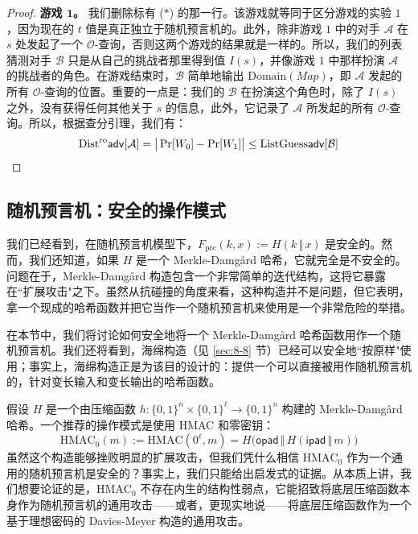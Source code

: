 \begin{proof}
\vspace{5pt}

\noindent\textbf{游戏 $\mathbf{1}$。}
我们删除标有 ($*$) 的那一行。该游戏就等同于区分游戏的实验 $1$，因为现在的 $t$ 值是真正独立于随机预言机的。此外，除非游戏 $1$ 中的对手 $\mathcal{A}$ 在 $s$ 处发起了一个 $\mathcal{O}$-查询，否则这两个游戏的结果就是一样的。所以，我们的列表猜测对手 $\mathcal{B}$ 只是从自己的挑战者那里得到值 $I(s)$，并像游戏 $1$ 中那样扮演 $\mathcal{A}$ 的挑战者的角色。在游戏结束时，$\mathcal{B}$ 简单地输出 $\mathrm{Domain}(Map)$，即 $\mathcal{A}$ 发起的所有 $\mathcal{O}$-查询的位置。重要的一点是：我们的 $\mathcal{B}$ 在扮演这个角色时，除了 $I(s)$ 之外，没有获得任何其他关于 $s$ 的信息，此外，它记录了 $\mathcal{A}$ 所发起的所有 $\mathcal{O}$-查询。所以，根据查分引理，我们有：
\[
\mathrm{Dist}^\mathrm{ro}\mathsf{adv}[\mathcal{A}]=
\big\lvert
\Pr[W_0]-\Pr[W_1]
\big\rvert
\leq
\mathrm{ListGuess}\mathsf{adv}[\mathcal{B}]\qedhere
\]
\end{proof}

\subsection{随机预言机：安全的操作模式}\label{subsec:8-10-3}

我们已经看到，在随机预言机模型下，$F_\mathrm{pre}(k,x):=H(k\,\Vert\,x)$ 是安全的。然而，我们还知道，如果 $H$ 是一个 Merkle-Damg{\aa}rd 哈希，它就完全是不安全的。问题在于，Merkle-Damg{\aa}rd 构造包含一个非常简单的迭代结构，这将它暴露在``扩展攻击"之下。虽然从抗碰撞的角度来看，这种构造并不是问题，但它表明，拿一个现成的哈希函数并把它当作一个随机预言机来使用是一个非常危险的举措。

在本节中，我们将讨论如何安全地将一个 Merkle-Damg{\aa}rd 哈希函数用作一个随机预言机。我们还将看到，海绵构造（见 \ref{sec:8-8} 节）已经可以安全地``按原样"使用；事实上，海绵构造正是为该目的设计的：提供一个可以直接被用作随机预言机的，针对变长输入和变长输出的哈希函数。

假设 $H$ 是一个由压缩函数 $h:\{0,1\}^n\times\{0,1\}^\ell\to\{0,1\}^n$ 构建的 Merkle-Damg{\aa}rd 哈希。一个推荐的操作模式是使用 HMAC 和零密钥：
\[
\mathrm{HMAC}_0(m)
:=\mathrm{HMAC}(0^\ell,m)
=H\big(\mathsf{opad}\,\Vert\,H(\mathsf{ipad}\,\Vert\,m)\big)
\]
虽然这个构造能够挫败明显的扩展攻击，但我们凭什么相信 $\mathrm{HMAC}_0$ 作为一个通用的随机预言机是安全的？事实上，我们只能给出启发式的证据。从本质上讲，我们想要论证的是，$\mathrm{HMAC}_0$ 不存在内生的结构性弱点，它能招致将底层压缩函数本身作为随机预言机的通用攻击——或者，更现实地说——将底层压缩函数作为一个基于理想密码的 Davies-Meyer 构造的通用攻击。

